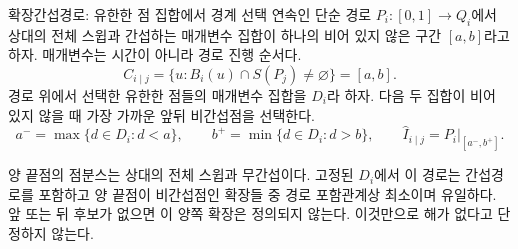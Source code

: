 \begin{frame}{확장간섭경로: 유한한 점 집합에서 경계 선택}
\small
연속인 단순 경로 $P_i:[0,1]\to Q_i$에서 상대의 전체 스윕과 간섭하는
매개변수 집합이 하나의 비어 있지 않은 구간 $[a,b]$라고 하자.
매개변수는 시간이 아니라 경로 진행 순서다.
\begin{equation}
 C_{i\mid j}=\{u:B_i(u)\cap S(P_j)\ne\varnothing\}=[a,b].\tag{24}
\end{equation}
경로 위에서 선택한 유한한 점들의 매개변수 집합을 $D_i$라 하자. 다음 두 집합이
비어 있지 않을 때 가장 가까운 앞뒤 비간섭점을 선택한다.
\begin{equation}
 a^- =\max\{d\in D_i:d<a\},\qquad
 b^+ =\min\{d\in D_i:d>b\},\qquad
 \widehat I_{i\mid j}=P_i|_{[a^-,b^+]}.\tag{25}
\end{equation}
\begin{center}\end{center}
\footnotesize 양 끝점의 점분스는 상대의 전체 스윕과 무간섭이다.
고정된 $D_i$에서 이 경로는 간섭경로를 포함하고 양 끝점이 비간섭점인
확장들 중 경로 포함관계상 최소이며 유일하다. 앞 또는 뒤 후보가 없으면
이 양쪽 확장은 정의되지 않는다. 이것만으로 해가 없다고 단정하지 않는다.
\end{frame}

